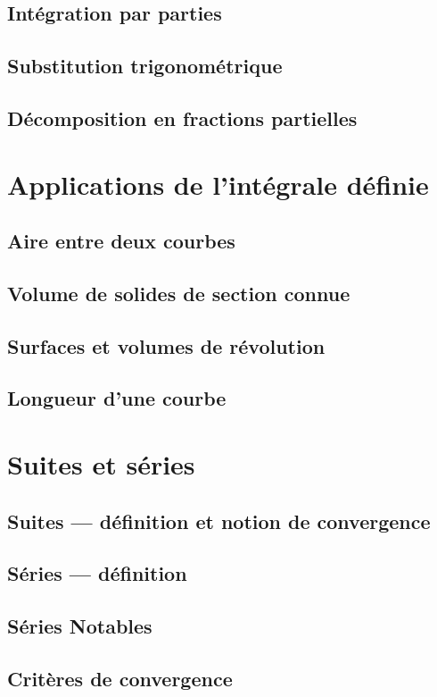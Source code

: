 \documentclass{article}
\begin{document}
\subsection{Intégration par parties}
\subsection{Substitution trigonométrique}
\subsection{Décomposition en fractions partielles}
\section{Applications de l’intégrale définie}
\subsection{Aire entre deux courbes}
\subsection{Volume de solides de section connue}
\subsection{Surfaces et volumes de révolution}
\subsection{Longueur d’une courbe}
\section{Suites et séries}
\subsection{Suites — définition et notion de convergence}
\subsection{Séries — définition}
\subsection{Séries Notables}
\subsection{Critères de convergence}
\end{document}
